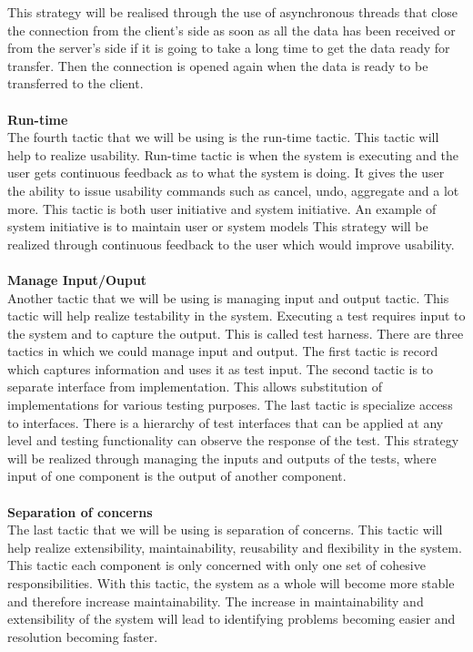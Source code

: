 \documentclass[a4paper]{article}
\begin{document}
This strategy will be realised through the use of asynchronous threads that close the connection from the client’s side as soon as all the data has been received or from the server’s side if it is going to take a long time to get the data ready for transfer. Then the connection is opened again when the data is ready to be transferred to the client. 
\\
\\\textbf{Run-time}
\\The fourth tactic that we will be using is the run-time tactic. This tactic will help to realize usability. Run-time tactic is when the system is executing and the user gets continuous feedback as to what the system is doing. It gives the user the ability to issue usability commands such as cancel, undo, aggregate and a lot more.  This tactic is both user initiative and system initiative. An example of system initiative is to maintain user or system models
This strategy will be realized through continuous feedback to the user which would improve usability.
\\
\\\textbf{Manage Input/Ouput}
\\Another tactic that we will be using is managing input and output tactic. This tactic will help realize testability in the system. Executing a test requires input to the system and to capture the output. This is called test harness. There are three tactics in which we could manage input and output. The first tactic is record which captures information and uses it as test input. The second tactic is to separate interface from implementation. This allows substitution of implementations for various testing purposes. The last tactic is specialize access to interfaces. There is a hierarchy of test interfaces that can be applied at any level and testing functionality can observe the response of the test.
This strategy will be realized through managing the inputs and outputs of the tests, where input of one component is the output of another component.
\\
\\\textbf{Separation of concerns}
\\The last tactic that we will be using is separation of concerns. This tactic will help realize extensibility, maintainability, reusability and flexibility in the system. This tactic each component is only concerned with only one set of cohesive responsibilities. With this tactic, the system as a whole will become more stable and therefore increase maintainability. The increase in maintainability and extensibility of the system will lead to identifying problems becoming easier and resolution becoming faster.
\end{document}
